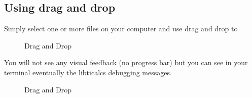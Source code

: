 \documentclass[10pt]{report}
\begin{document}
\subsection{Using drag and drop}
Simply select one or more files on your computer and use drag and drop to

\begin{figure}[H]
\centering
{}
\caption{Drag and Drop}
\end{figure}

You will not see any visual feedback (no progress bar) but you can see in your terminal eventually the libticalcs debugging messages.\newline

\begin{figure}[H]
\centering
{}
\caption{Drag and Drop}
\end{figure}
\end{document}

